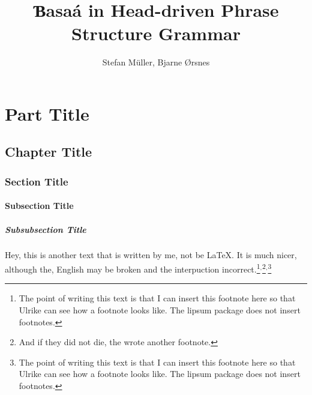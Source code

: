 \documentclass[ number=45
			   ,series=eotms
			   ,output=printondemand %
			  ]{langsci}
\title{Ɓasaá in \newlineCover Head-driven \newlineCover\newlineSpine Phrase Structure Grammar \newlineCover \PRL{او مرد را دوست داشت.} }
\author{Stefan Müller, \newlineCover Bjarne Ørsnes}
\begin{document}
               
        
                                    
                           
\maketitle                

\tableofcontents      
        
\part{Part Title}	               
\chapter{Chapter Title}
\section{Section Title}
\subsection{Subsection Title}
\subsubsection{Subsubsection Title}       
  

Hey, this is another text that is written by me, not be \LaTeX{}. It is much nicer, although the,
English may be broken and the interpuction incorrect.\footnote{
  The point of writing this text is that I can insert this footnote here so that Ulrike can see how
  a footnote looks like. The lipsum package does not insert footnotes.
}$^,$\footnote{
  And if they did not die, the wrote another footnote.
}$^,$\footnote{
  The point of writing this text is that I can insert this footnote here so that Ulrike can see how
  a footnote looks like. The lipsum package does not insert footnotes.
}


\lipsum 
\lipsum[3-10]  

 

\newpage

\layout
                              
\end{document}
